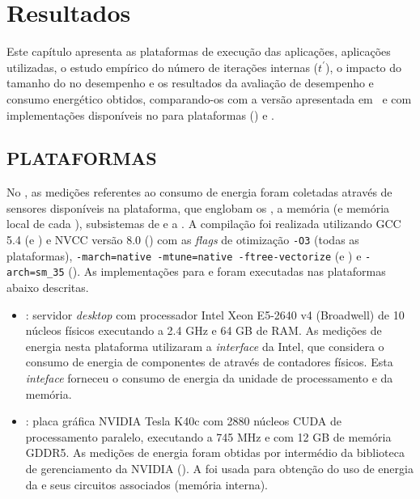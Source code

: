 %

\chapter{Resultados}
\label{cap:resultados}

Este capítulo apresenta as plataformas de execução das aplicações, aplicações utilizadas, o estudo empírico do número de iterações internas ($t^\prime$), o impacto do tamanho do \tile no desempenho e os resultados da avaliação de desempenho e consumo energético obtidos, comparando-os com a versão \ipc apresentada em~\cite{Podesta:TCC} e com implementações disponíveis no \pskel para plataformas \multicore (\cpu) e \gpu.

\section{PLATAFORMAS}
\label{sec:plataformas}

No \mppa, as medições referentes ao consumo de energia foram coletadas através de sensores disponíveis na plataforma, que englobam os \clusters, a memória (\lpddr e memória local de cada \cluster), subsistemas de \io e a \noc. A compilação foi realizada utilizando GCC 5.4 (\mppa e \cpu) e NVCC versão 8.0 (\gpu) com as \textit{flags} de otimização \texttt{-O3} (todas as plataformas), \texttt{-march=native -mtune=native -ftree-vectorize} (\cpu e \gpu) e \texttt{-arch=sm\_35} (\gpu). As implementações para \cpu e \gpu foram executadas nas plataformas abaixo descritas.

\begin{itemize}

  \item \textbf{\xeon}: servidor \textit{desktop} com processador Intel Xeon E5-2640 v4 (Broadwell) de 10 núcleos físicos executando a 2.4 GHz e 64 GB de RAM. As medições de energia nesta plataforma utilizaram a \textit{interface} \rapl da Intel, que considera o consumo de energia de componentes de \hw através de contadores físicos. Esta \textit{inteface} forneceu o consumo de energia da unidade de processamento e da memória.

  \item \textbf{\tesla}: placa gráfica NVIDIA Tesla K40c com 2880 núcleos CUDA de processamento paralelo, executando a 745 MHz e com 12 GB de memória GDDR5. As medições de energia foram obtidas por intermédio da biblioteca de gerenciamento da NVIDIA (\nvml). A \nvml foi usada para obtenção do uso de energia da \gpu e seus circuitos associados (\eg memória interna).

\end{itemize}

